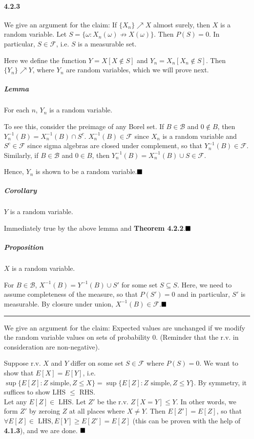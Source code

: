 \documentclass[a4paper]{article}
\newcommand{\alg}[0]{\mathcal{F}} %
\newcommand{\borel}[0]{\mathcal{B}} %
\newcommand{\qedsymbol}{\hfill\blacksquare}
\newcommand{\divider}[0]{\begin{center}
\rule{16cm}{0.5pt}
\end{center}}
\begin{document}
\paragraph{4.2.3} 

We give an argument for the claim: If $\{X_n\}\nearrow X$ almost surely, then $X$ is a random variable. Let $S = \{\omega : X_n(\omega)\not \rightarrow X(\omega)\}$. Then $P(S) = 0$. In particular, $S\in \alg$, i.e. $S$ is a measurable set.

Here we define the function $Y = X[X\notin S]$ and $Y_n = X_n[X_n\notin S]$. Then $\{Y_n\}\nearrow Y$, where $Y_n$ are random variables, which we will prove next.

\subparagraph{Lemma} For each $n$, $Y_n$ is a random variable.

To see this, consider the preimage of any Borel set. If $B\in \borel$ and $0\notin B$, then $Y_n^{-1}(B) = X_n^{-1}(B)\cap S^c$. $X_n^{-1}(B)\in \alg$ since $X_n$ is a random variable and $S^c\in \alg$ since sigma algebras are closed under complement, so that $Y_n^{-1}(B)\in \alg$.\\
Similarly, if $B\in \borel$ and $0\in B$, then $Y_n^{-1}(B) = X_n^{-1}(B)\cup S\in \alg$.

Hence, $Y_n$ is shown to be a random variable.$\qedsymbol$

\subparagraph{Corollary} $Y$ is a random variable.

Immediately true by the above lemma and \textbf{Theorem 4.2.2}.$\qedsymbol$


\subparagraph{Proposition} $X$ is a random variable.

For $B\in \borel$, $X^{-1}(B) = Y^{-1}(B)\cup S'$ for some set $S\subseteq S$. Here, we need to assume completeness of the measure, so that $P(S')=0$ and in particular, $S'$ is measurable. By closure under union, $X^{-1}(B)\in \alg$.$\qedsymbol$

\divider

We give an argument for the claim: Expected values are unchanged if we modify the random variable values on sets of probability $0$. (Reminder that the r.v. in consideration are non-negative).

Suppose r.v. $X$ and $Y$ differ on some set $S\in \alg$ where $P(S) = 0$. We want to show that $E[X] = E[Y]$, i.e. $\sup \{E[Z] : Z\text{ simple}, Z\leq X\} = \sup \{E[Z] : Z\text{ simple}, Z\leq Y\}$. By symmetry, it suffices to show LHS $\leq$ RHS.\\
Let any $E[Z]\in$ LHS. Let $Z'$ be the r.v. $Z[X=Y]\leq Y$. In other words, we form $Z'$ by zeroing $Z$ at all places where $X\neq Y$. Then $E[Z'] = E[Z]$, so that $\forall E[Z]\in \text{ LHS}, E[Y]\geq E[Z'] = E[Z]$ (this can be proven with the help of \textbf{4.1.3}), and we are done. $\qedsymbol$
\end{document}
